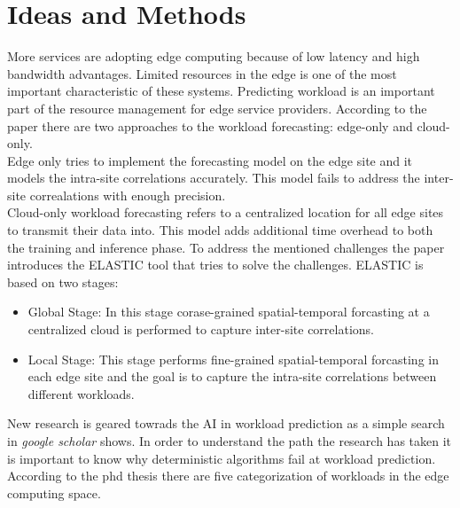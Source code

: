 \documentclass[a4paper, 11pt]{article}
\theoremstyle{nonumberplain}
\begin{document}
\section{Ideas and Methods}
More services are adopting edge computing because of low latency and high
bandwidth advantages. Limited resources in the edge is one of the most
important characteristic of these systems. Predicting workload is an important
part of the resource management for edge service providers.
According to the paper \cite{paper} there are two approaches to the workload
forecasting: edge-only and cloud-only. \\
Edge only tries to implement the forecasting model on the edge site and
it models the intra-site correlations accurately. This model fails to
address the inter-site correalations with enough precision. \\
Cloud-only workload forecasting refers to a centralized location for all edge
sites to transmit their data into. This model adds additional time overhead
to both the training and inference phase. To address the mentioned challenges
the paper \cite{paper} introduces the ELASTIC tool that tries to solve the
challenges. ELASTIC is based on two stages:
\begin{itemize}
    \item Global Stage: In this stage corase-grained spatial-temporal
        forcasting at a centralized cloud is performed to capture
        inter-site correlations.
    \item Local Stage: This stage performs fine-grained spatial-temporal
        forcasting in each edge site and the goal is to capture
        the intra-site correlations between different workloads.
\end{itemize}
New research is geared towrads the AI in workload prediction as a simple search
in \textit{google scholar} shows. In order to understand the path the research
has taken it is important to know why deterministic algorithms fail at
workload prediction.
According to the phd thesis \cite{phd} there are five categorization of
workloads in the edge computing space.
\end{document}
